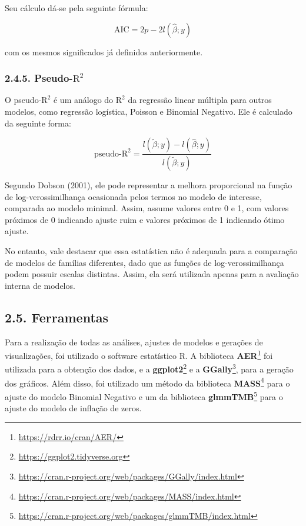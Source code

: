 \documentclass[
]{article}
\begin{document}
Seu cálculo dá-se pela seguinte fórmula:

\[
\text{AIC} = 2p - 2l(\hat{\beta}; y)
\]

com os mesmos significados já definidos anteriormente.

\subsubsection{\texorpdfstring{2.4.5.
Pseudo-\(\text{R}^2\)}{2.4.5. Pseudo-\textbackslash text\{R\}\^{}2}}\label{pseudo-textr2}

O pseudo-\(\text{R}^2\) é um análogo do \(\text{R}^2\) da regressão
linear múltipla para outros modelos, como regressão logística, Poisson e
Binomial Negativo. Ele é calculado da seguinte forma:

\[
\text{pseudo-R}^2 = \dfrac{l(\tilde{\beta}; y) - l(\hat{\beta}; y)}{l(\tilde{\beta}; y)}
\]

Segundo Dobson (2001), ele pode representar a melhora proporcional na
função de log-verossimilhança ocasionada pelos termos no modelo de
interesse, comparada ao modelo minimal. Assim, assume valores entre 0 e
1, com valores próximos de 0 indicando ajuste ruim e valores próximos de
1 indicando ótimo ajuste.

No entanto, vale destacar que essa estatística não é adequada para a
comparação de modelos de famílias diferentes, dado que as funções de
log-verossimilhança podem possuir escalas distintas. Assim, ela será
utilizada apenas para a avaliação interna de modelos.

\subsection{2.5. Ferramentas}\label{ferramentas}

Para a realização de todas as análises, ajustes de modelos e gerações de
visualizações, foi utilizado o software estatístico R. A biblioteca
\textbf{AER}\footnote{\url{https://rdrr.io/cran/AER/}} foi utilizada
para a obtenção dos dados, e a \textbf{ggplot2}\footnote{\url{https://ggplot2.tidyverse.org}}
e a \textbf{GGally}\footnote{\url{https://cran.r-project.org/web/packages/GGally/index.html}},
para a geração dos gráficos. Além disso, foi utilizado um método da
biblioteca \textbf{MASS}\footnote{\url{https://cran.r-project.org/web/packages/MASS/index.html}}
para o ajuste do modelo Binomial Negativo e um da biblioteca
\textbf{glmmTMB}\footnote{\url{https://cran.r-project.org/web/packages/glmmTMB/index.html}}
para o ajuste do modelo de inflação de zeros.
\end{document}
